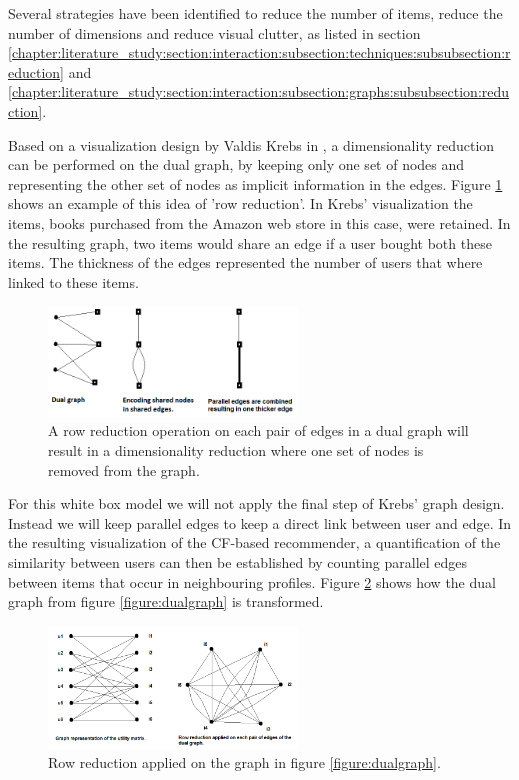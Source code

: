 Several strategies have been identified to reduce the number of items, reduce the number of dimensions and reduce visual clutter, as listed in section \ref{chapter:literature_study:section:interaction:subsection:techniques:subsubsection:reduction} and \ref{chapter:literature_study:section:interaction:subsection:graphs:subsubsection:reduction}.

Based on a visualization design by Valdis Krebs in \cite{steele:2010}, a dimensionality reduction can be performed on the dual graph, by keeping only one set of nodes and representing the other set of nodes as implicit information in the edges. Figure \ref{figure:rowreduction} shows an example of this idea of 'row reduction'. In Krebs' visualization the items, books purchased from the Amazon web store in this case, were retained. In the resulting graph, two items would share an edge if a user bought both these items. The thickness of the edges represented the number of users that where linked to these items\cite{krebs:2012:networkthinkers, steele:2010}.

\begin{figure}%
	\begin{center}
		\includegraphics[width=250px]{img/row_reduction}%
	\end{center}
	\caption{A row reduction operation on each pair of edges in a dual graph will result in a dimensionality reduction where one set of nodes is removed from the graph.}%
	\label{figure:rowreduction}%
\end{figure}

For this white box model we will not apply the final step of Krebs' graph design. Instead we will keep parallel edges to keep a direct link between user and edge. In the resulting visualization of the CF-based recommender, a quantification of the similarity between users can then be established by counting parallel edges between items that occur in neighbouring profiles. Figure \ref{figure:rowreduction_dualgraph} shows how the dual graph from figure \ref{figure:dualgraph} is transformed.

\begin{figure}%
	\begin{center}
		\includegraphics[width=250px]{img/dualgraph_rowreduction}%
	\end{center}
	\caption{Row reduction applied on the graph in figure \ref{figure:dualgraph}.}%
	\label{figure:rowreduction_dualgraph}%
\end{figure}

